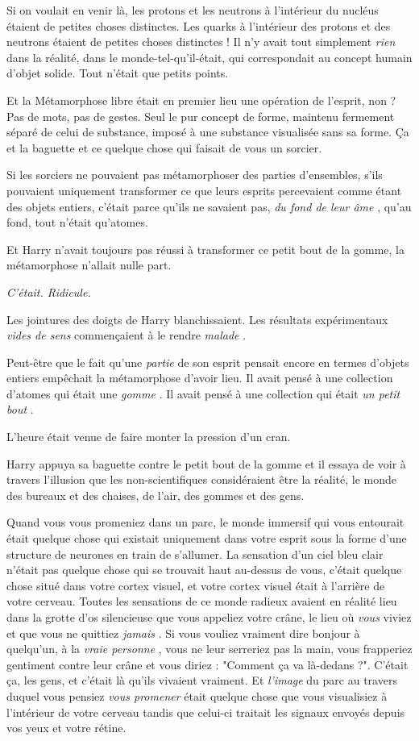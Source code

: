Si on voulait en venir là, les protons et les neutrons à l'intérieur du nucléus étaient de petites choses distinctes. Les quarks à l'intérieur des protons et des neutrons étaient de petites choses distinctes ! Il n'y avait tout simplement \emph{rien}  dans la réalité, dans le monde-tel-qu'il-était, qui correspondait au concept humain d'objet solide. Tout n'était que petits points.

Et la Métamorphose libre était en premier lieu une opération de l'esprit, non ? Pas de mots, pas de gestes. Seul le pur concept de forme, maintenu fermement séparé de celui de substance, imposé à une substance visualisée sans sa forme. Ça et la baguette et ce quelque chose qui faisait de vous un sorcier.

Si les sorciers ne pouvaient pas métamorphoser des parties d'ensembles, s'ils pouvaient uniquement transformer ce que leurs esprits percevaient comme étant des objets entiers, c'était parce qu'ils ne savaient pas, \emph{du fond de leur âme} , qu'au fond, tout n'était qu'atomes.

Et Harry n'avait toujours pas réussi à transformer ce petit bout de la gomme, la métamorphose n'allait nulle part.

\emph{C'était. Ridicule.} 

Les jointures des doigts de Harry blanchissaient. Les résultats expérimentaux \emph{vides de sens}  commençaient à le rendre \emph{malade} .

Peut-être que le fait qu'une \emph{partie}  de son esprit pensait encore en termes d'objets entiers empêchait la métamorphose d'avoir lieu. Il avait pensé à une collection d'atomes qui était une \emph{gomme} . Il avait pensé à une collection qui était \emph{un petit bout} .

L'heure était venue de faire monter la pression d'un cran.

Harry appuya sa baguette contre le petit bout de la gomme et il essaya de voir à travers l'illusion que les non-scientifiques considéraient être la réalité, le monde des bureaux et des chaises, de l'air, des gommes et des gens.

Quand vous vous promeniez dans un parc, le monde immersif qui vous entourait était quelque chose qui existait uniquement dans votre esprit sous la forme d'une structure de neurones en train de s'allumer. La sensation d'un ciel bleu clair n'était pas quelque chose qui se trouvait haut au-dessus de vous, c'était quelque chose situé dans votre cortex visuel, et votre cortex visuel était à l'arrière de votre cerveau. Toutes les sensations de ce monde radieux avaient en réalité lieu dans la grotte d'os silencieuse que vous appeliez votre crâne, le lieu où \emph{vous } viviez et que vous ne quittiez \emph{jamais} . Si vous vouliez vraiment dire bonjour à quelqu'un, à la \emph{vraie personne} , vous ne leur serreriez pas la main, vous frapperiez gentiment contre leur crâne et vous diriez : "Comment ça va là-dedans ?". C'était ça, les gens, et c'était là qu'ils vivaient vraiment. Et \emph{l'image}  du parc au travers duquel vous pensiez \emph{vous promener}  était quelque chose que vous visualisiez à l'intérieur de votre cerveau tandis que celui-ci traitait les signaux envoyés depuis vos yeux et votre rétine.

